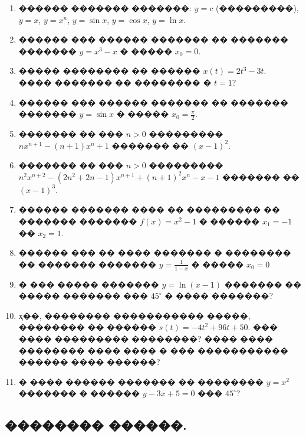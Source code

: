 \documentclass[a4paper,12pt]{article}
\begin{document}
\begin{enumerate}
 \item ������ ������� �������: $y=c$ (���������), $y=x$, $y=x^{n}$, $y=\sin x$, $y=\cos x$, $y=\ln x$.

\item ������ ��� ������ ������� �� ������� ������� $y=x^{3}-x$ � ����� $x_{0}=0$.

\item ����� �������� �� ������ $x(t)=2t^{3}-3t$. ���� ������� �� �������� � $t=1$?

\item ������ ��� ������ ������� �� ������� ������� $y=\sin x$ � ����� $x_{0}=\frac{\pi}{2}$.

\item ������� �� ��� $n>0$ ��������� $nx^{n+1}-(n+1)x^{n}+1$ ������� �� $(x-1)^{2}$.

\item ������� �� ��� $n>0$ ��������� $n^{2}x^{n+2}-(2n^{2}+2n-1)x^{n+1}+(n+1)^{2}x^{n}-x-1$ ������� �� $(x-1)^{3}$.

\item ������ ������� ���� �� ��������� �� ������� ������� $f(x)=x^{2}-1$ � ������ $x_{1}=-1$ �� $x_{2}=1$.

\item ������ ��� �� ���� ������� � �������� �� ������� ������� $y=\frac{1}{1-x}$ � ����� $x_{0}=0$

\item � ��� ����� ������� $y=\ln (x-1)$ ������� �� ����� ������� ��� $45^{\circ}$ � ���� �������?

\item ҳ��, �������� ����������� �����, �������� �� ������ $s(t) = -4t^{2}+96t+50$. ��� ���� ��������� ��������? ���� ���� �������� ���� ���� � ��� ����������� ������ ���� ������?

\item � ���� ������ ������� �� �������� $y=x^{2}$ ������� � ������ $y-3x+5=0$ ��� $45^{\circ}$?
\end{enumerate}











\newpage

\begin{center}
\section*{�������� ������.}
\end{center}
\end{document}
